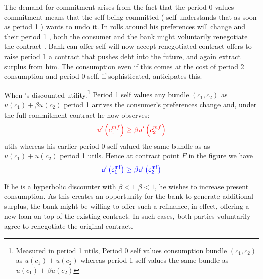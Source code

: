\documentclass[11pt]{article}%
\providecommand{\DIFadd}[1]{{\protect\color{blue} \sf #1}} %
\providecommand{\DIFdel}[1]{{\protect\color{red} \scriptsize #1}} %
\providecommand{\DIFaddFL}[1]{\DIFadd{#1}} %
\providecommand{\DIFdelFL}[1]{\DIFdel{#1}} %
\providecommand{\DIFaddbeginFL}{} %
\providecommand{\DIFaddendFL}{} %
\providecommand{\DIFdelbeginFL}{} %
\providecommand{\DIFdelendFL}{} %
\begin{document}
\DIFaddFL{The demand for commitment arises from the fact that the period }\DIFaddendFL 0 \DIFdelbeginFL \DIFdelFL{values
commitment means that the self being committed (}\DIFdelendFL \DIFaddbeginFL \DIFaddFL{self understands that as soon as }\DIFaddendFL period 1 \DIFdelbeginFL \DIFdelFL{) wants to undo it.
In }\DIFdelendFL \DIFaddbeginFL \DIFaddFL{rolls around his preferences will change and their }\DIFaddendFL period 1 \DIFdelbeginFL \DIFdelFL{, both the consumer and the bank might voluntarily renegotiate
the contract . Bank can offer }\DIFdelendFL \DIFaddbeginFL \DIFaddFL{self will now accept renegotiated contract offers to raise }\DIFaddendFL period 1 \DIFdelbeginFL \DIFdelFL{a contract that pushes debt into the future, and again extract surplus from him. The }\DIFdelendFL \DIFaddbeginFL \DIFaddFL{consumption even if this comes at the cost of period 2 consumption and }\DIFaddendFL period 0\DIFdelbeginFL \DIFdelFL{self, if
sophisticated, anticipates this.}%

\DIFdelFL{When }\DIFdelendFL \DIFaddbeginFL \DIFaddFL{'s discounted utility.}\footnote{\DIFaddFL{Measured in period 1 utils, Period 0 self values consumption bundle $(c_{1},c_{2})$ as $u(c_{1}) + u(c_{2})$ whereas period 1 self values the same bundle as $u(c_{1}) + \beta u(c_{2})$}} \DIFaddFL{Period 1 self values any bundle $(c_{1},c_{2})$ as $u(c_{1}) + \beta u(c_{2})$ }\DIFaddendFL period 1 \DIFdelbeginFL \DIFdelFL{arrives the consumer's preferences change and, under the
full-commitment contract he now observes:%
}\begin{displaymath}\DIFdelFL{
u^{\prime }\left( c_{1}^{mf}\right) \geq \beta u^{\prime }\left(
c_{2}^{mf}\right)
}\end{displaymath}
\DIFdelendFL \DIFaddbeginFL \DIFaddFL{utils whereas his earlier period 0 self valued the same bundle as as $u(c_{1}) + u(c_{2})$ period 1 utils.  Hence at contract point $F$ in the figure we have
}\[\DIFaddFL{
u^{\prime}\left(  c_{1}^{mf}\right)  \geq\beta u^{\prime}\left(  c_{2}%
^{mf}\right)
}\]
\DIFaddendFL 

If he is a hyperbolic discounter with \DIFdelbeginFL \DIFdelFL{$\beta <1$}\DIFdelendFL \DIFaddbeginFL \DIFaddFL{$\beta<1$}\DIFaddendFL , he wishes to increase present
consumption. As \DIFdelbeginFL \DIFdelFL{this creates an opportunity for the bank to generate
additional surplus, the bank might be willing to offer such a refinance, in
effect, offering a new loan on top of the existing contract. In such cases,
both parties voluntarily agree to renegotiate the original contract.
}%
\end{document}
